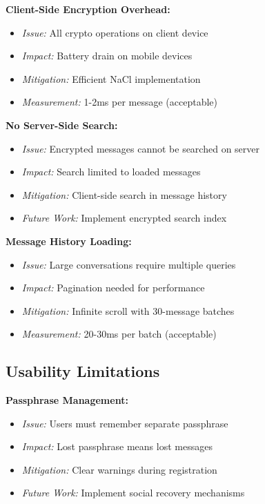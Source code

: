 \textbf{Client-Side Encryption Overhead:}
\begin{itemize}
    \item \textit{Issue:} All crypto operations on client device
    \item \textit{Impact:} Battery drain on mobile devices
    \item \textit{Mitigation:} Efficient NaCl implementation
    \item \textit{Measurement:} 1-2ms per message (acceptable)
\end{itemize}

\textbf{No Server-Side Search:}
\begin{itemize}
    \item \textit{Issue:} Encrypted messages cannot be searched on server
    \item \textit{Impact:} Search limited to loaded messages
    \item \textit{Mitigation:} Client-side search in message history
    \item \textit{Future Work:} Implement encrypted search index
\end{itemize}

\textbf{Message History Loading:}
\begin{itemize}
    \item \textit{Issue:} Large conversations require multiple queries
    \item \textit{Impact:} Pagination needed for performance
    \item \textit{Mitigation:} Infinite scroll with 30-message batches
    \item \textit{Measurement:} 20-30ms per batch (acceptable)
\end{itemize}

\subsection{Usability Limitations}

\textbf{Passphrase Management:}
\begin{itemize}
    \item \textit{Issue:} Users must remember separate passphrase
    \item \textit{Impact:} Lost passphrase means lost messages
    \item \textit{Mitigation:} Clear warnings during registration
    \item \textit{Future Work:} Implement social recovery mechanisms
\end{itemize}

